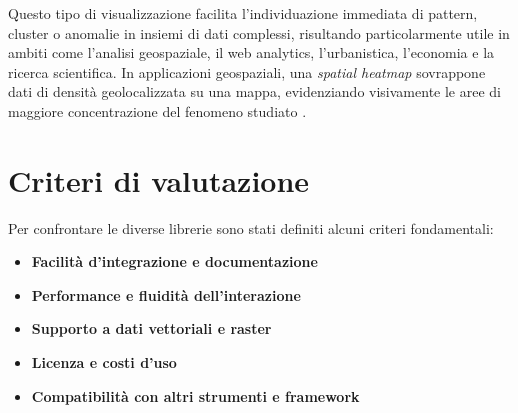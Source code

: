 Questo tipo di visualizzazione facilita l'individuazione immediata di pattern, cluster
o anomalie in insiemi di dati complessi, risultando particolarmente utile in
ambiti come l'analisi geospaziale, il web analytics, l'urbanistica, l'economia e
la ricerca scientifica. In applicazioni geospaziali, una \emph{spatial heatmap}
sovrappone dati di densità geolocalizzata su una mappa, evidenziando visivamente
le aree di maggiore concentrazione del fenomeno studiato \cite{vwo-heatmap,heatmap-wikipedia,clarity-heatmap}.

\section{Criteri di valutazione}
Per confrontare le diverse librerie sono stati definiti alcuni criteri fondamentali:
\begin{itemize}
  \item \textbf{Facilità d'integrazione e documentazione}

  \item \textbf{Performance e fluidità dell'interazione}

  \item \textbf{Supporto a dati vettoriali e raster}

  \item \textbf{Licenza e costi d'uso}

  \item \textbf{Compatibilità con altri strumenti e framework}
\end{itemize}






